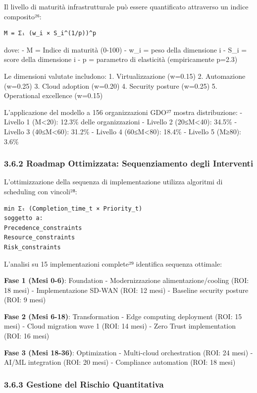 \documentclass[12pt,a4paper,oneside]{book}
\begin{document}
Il livello di maturità infrastrutturale può essere quantificato
attraverso un indice composito²⁶:

\begin{verbatim}
M = Σᵢ (w_i × S_i^(1/p))^p
\end{verbatim}

dove: - M = Indice di maturità (0-100) - w\_i = peso della dimensione i
- S\_i = score della dimensione i - p = parametro di elasticità
(empiricamente p=2.3)

Le dimensioni valutate includono: 1. Virtualizzazione (w=0.15) 2.
Automazione (w=0.25) 3. Cloud adoption (w=0.20) 4. Security posture
(w=0.25) 5. Operational excellence (w=0.15)

L'applicazione del modello a 156 organizzazioni GDO²⁷ mostra
distribuzione: - Livello 1 (M\textless20): 12.3\% delle organizzazioni -
Livello 2 (20≤M\textless40): 34.5\% - Livello 3 (40≤M\textless60):
31.2\% - Livello 4 (60≤M\textless80): 18.4\% - Livello 5 (M≥80): 3.6\%

\subsubsection{3.6.2 Roadmap Ottimizzata: Sequenziamento degli
Interventi}\label{roadmap-ottimizzata-sequenziamento-degli-interventi}

L'ottimizzazione della sequenza di implementazione utilizza algoritmi di
scheduling con vincoli²⁸:

\begin{verbatim}
min Σₜ (Completion_time_t × Priority_t)
soggetto a:
Precedence_constraints
Resource_constraints
Risk_constraints
\end{verbatim}

L'analisi su 15 implementazioni complete²⁹ identifica sequenza ottimale:

\textbf{Fase 1 (Mesi 0-6)}: Foundation - Modernizzazione
alimentazione/cooling (ROI: 18 mesi) - Implementazione SD-WAN (ROI: 12
mesi) - Baseline security posture (ROI: 9 mesi)

\textbf{Fase 2 (Mesi 6-18)}: Transformation - Edge computing deployment
(ROI: 15 mesi) - Cloud migration wave 1 (ROI: 14 mesi) - Zero Trust
implementation (ROI: 16 mesi)

\textbf{Fase 3 (Mesi 18-36)}: Optimization - Multi-cloud orchestration
(ROI: 24 mesi) - AI/ML integration (ROI: 20 mesi) - Compliance
automation (ROI: 18 mesi)

\subsubsection{3.6.3 Gestione del Rischio
Quantitativa}\label{gestione-del-rischio-quantitativa}
\end{document}
